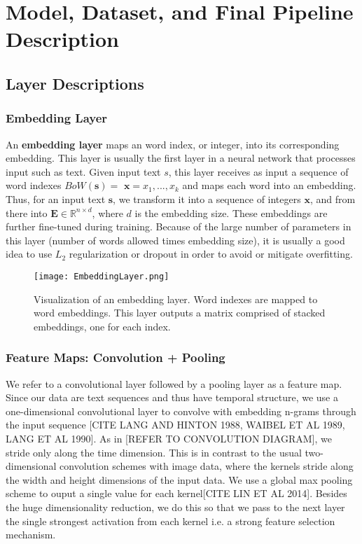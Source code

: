 
\chapter{Model, Dataset, and Final Pipeline Description}
\section{Layer Descriptions}
\subsection{Embedding Layer}
An \textbf{embedding layer} maps an word index, or integer, into its corresponding embedding.
This layer is usually the first layer in a neural network that processes input such as text.
Given input text $s$, this layer receives as input a sequence of word indexes $BoW(\bm{s})=$ $\bm{x} = x_1,...,x_k$
and maps each word into an embedding.
Thus, for an input text $\bm{s}$, we transform it into a sequence of integers $\bm{x}$, and from there into $\mathbf{E} \in \mathbb{R}^{n \times d}$, where $d$ is
the embedding size. These embeddings are further fine-tuned during training. Because of the large number of
parameters in this layer (number of words allowed times embedding size), it is usually a good idea to
use $L_2$ regularization or dropout in order to avoid or mitigate overfitting.

\begin{figure}[H]
\caption{Visualization of an embedding layer. Word indexes are mapped to word embeddings. This
layer outputs a matrix comprised of stacked embeddings, one for each index.}
\centering
\texttt{[image: EmbeddingLayer.png]}
\end{figure}

\subsection{Feature Maps: Convolution + Pooling}

We refer to a convolutional layer followed by a pooling layer as a feature map.
Since our data are text sequences and thus have temporal structure, we use a one-dimensional convolutional
layer to convolve with embedding n-grams through the input sequence [CITE LANG AND HINTON 1988, WAIBEL ET AL 1989,
LANG ET AL 1990].
As in [REFER TO CONVOLUTION DIAGRAM], we stride only along the time dimension. This is in contrast to the usual two-dimensional convolution schemes with image data,
where the kernels stride along the width and height dimensions of the input data.
We use a global max pooling scheme to ouput a single value for each kernel[CITE LIN ET AL 2014]. Besides the huge
dimensionality reduction, we do this so that we pass to the next layer the single strongest activation
from each kernel i.e. a strong feature selection mechanism.

